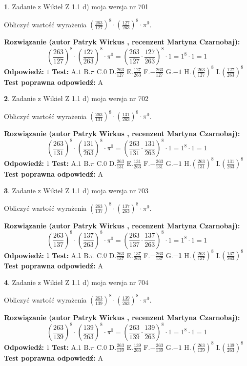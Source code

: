 \documentclass[12pt, a4paper]{article}
\theoremstyle{definition} %
\newtheorem{zad}{}
\newcommand{\zadStart}[1]{\begin{zad}#1\newline}
\newcommand{\zadStop}{\end{zad}}
\newcommand{\rozwStart}[2]{\noindent \textbf{Rozwiązanie (autor #1 , recenzent #2): }\newline}
\newcommand{\rozwStop}{\newline}
\newcommand{\odpStart}{\noindent \textbf{Odpowiedź:}\newline}
\newcommand{\odpStop}{\newline}
\newcommand{\testStart}{\noindent \textbf{Test:}\newline}
\newcommand{\testStop}{\newline}
\newcommand{\kluczStart}{\noindent \textbf{Test poprawna odpowiedź:}\newline}
\newcommand{\kluczStop}{\newline}
\begin{document}
\zadStart{Zadanie z Wikieł Z 1.1 d) moja wersja nr 701}

Obliczyć wartość wyrażenia $(\frac{263}{127})^{8} \cdot (\frac{127}{263})^{8} \cdot \pi^{0}$.
\zadStop
\rozwStart{Patryk Wirkus}{Martyna Czarnobaj}
$$(\frac{263}{127})^{8} \cdot (\frac{127}{263})^{8} \cdot \pi^{0} = (\frac{263}{127} \cdot \frac{127}{263})^{8} \cdot 1 = 1^{8} \cdot 1 = 1$$
\rozwStop
\odpStart
$1$
\odpStop
\testStart
A.$1$ B.$\pi$ C.$0$ D.$\frac{263}{127}$ E.$\frac{127}{263}$
F.$-\frac{263}{127}$ G.$-1$
H.$(\frac{263}{127})^{8}$
I.$(\frac{127}{263})^{8}$
\testStop
\kluczStart
A
\kluczStop



\zadStart{Zadanie z Wikieł Z 1.1 d) moja wersja nr 702}

Obliczyć wartość wyrażenia $(\frac{263}{131})^{8} \cdot (\frac{131}{263})^{8} \cdot \pi^{0}$.
\zadStop
\rozwStart{Patryk Wirkus}{Martyna Czarnobaj}
$$(\frac{263}{131})^{8} \cdot (\frac{131}{263})^{8} \cdot \pi^{0} = (\frac{263}{131} \cdot \frac{131}{263})^{8} \cdot 1 = 1^{8} \cdot 1 = 1$$
\rozwStop
\odpStart
$1$
\odpStop
\testStart
A.$1$ B.$\pi$ C.$0$ D.$\frac{263}{131}$ E.$\frac{131}{263}$
F.$-\frac{263}{131}$ G.$-1$
H.$(\frac{263}{131})^{8}$
I.$(\frac{131}{263})^{8}$
\testStop
\kluczStart
A
\kluczStop



\zadStart{Zadanie z Wikieł Z 1.1 d) moja wersja nr 703}

Obliczyć wartość wyrażenia $(\frac{263}{137})^{8} \cdot (\frac{137}{263})^{8} \cdot \pi^{0}$.
\zadStop
\rozwStart{Patryk Wirkus}{Martyna Czarnobaj}
$$(\frac{263}{137})^{8} \cdot (\frac{137}{263})^{8} \cdot \pi^{0} = (\frac{263}{137} \cdot \frac{137}{263})^{8} \cdot 1 = 1^{8} \cdot 1 = 1$$
\rozwStop
\odpStart
$1$
\odpStop
\testStart
A.$1$ B.$\pi$ C.$0$ D.$\frac{263}{137}$ E.$\frac{137}{263}$
F.$-\frac{263}{137}$ G.$-1$
H.$(\frac{263}{137})^{8}$
I.$(\frac{137}{263})^{8}$
\testStop
\kluczStart
A
\kluczStop



\zadStart{Zadanie z Wikieł Z 1.1 d) moja wersja nr 704}

Obliczyć wartość wyrażenia $(\frac{263}{139})^{8} \cdot (\frac{139}{263})^{8} \cdot \pi^{0}$.
\zadStop
\rozwStart{Patryk Wirkus}{Martyna Czarnobaj}
$$(\frac{263}{139})^{8} \cdot (\frac{139}{263})^{8} \cdot \pi^{0} = (\frac{263}{139} \cdot \frac{139}{263})^{8} \cdot 1 = 1^{8} \cdot 1 = 1$$
\rozwStop
\odpStart
$1$
\odpStop
\testStart
A.$1$ B.$\pi$ C.$0$ D.$\frac{263}{139}$ E.$\frac{139}{263}$
F.$-\frac{263}{139}$ G.$-1$
H.$(\frac{263}{139})^{8}$
I.$(\frac{139}{263})^{8}$
\testStop
\kluczStart
A
\kluczStop
\end{document}
